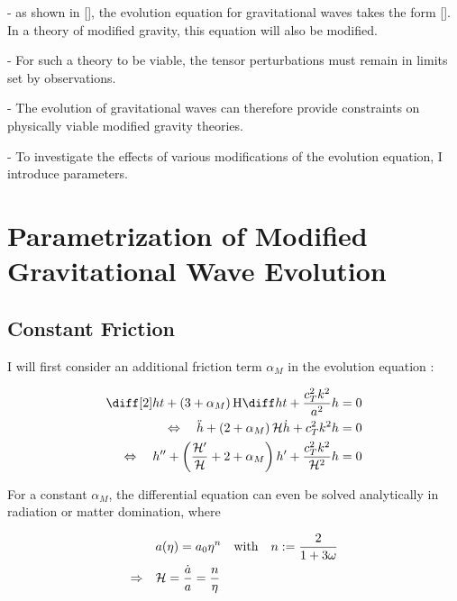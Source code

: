 \documentclass[parskip=half]{scrreprt}
\begin{document}
- as shown in [], the evolution equation for gravitational waves takes the form []. In a theory of modified gravity, this equation will also be modified.

- For such a theory to be viable, the tensor perturbations must remain in limits set by observations.

- The evolution of gravitational waves can therefore provide constraints on physically viable modified gravity theories.

- To investigate the effects of various modifications of the evolution equation, I introduce parameters.



\chapter{Parametrization of Modified Gravitational Wave Evolution}


\section{Constant Friction}

I will first consider an additional friction term $\alpha_M$ in the evolution equation \citep{Pettorino2014}:

\begin{align}\label{eq:evolution_friction}
	\ddt{h} + \left( 3 + \alpha_M \right) \Hcosm \dt{h} + \frac{c_T^2 k^2}{a^2} h &= 0 \\
	\Leftrightarrow \quad \ddconf{h} + \left( 2 + \alpha_M \right) \Hconf \dconf{h} + c_T^2 k^2 h &= 0 \\
    \Leftrightarrow \quad \ddefold{h} + \left( \frac{\defold{\Hconf}}{\Hconf} + 2 + \alpha_M \right) \defold{h} + \frac{c_T^2 k^2}{\Hconf^2} h &= 0
\end{align}


For a constant $\alpha_M$, the differential equation can even be solved analytically in radiation or matter domination, where

\begin{align}
	&a(\eta) = a_0 \eta^n \quad \textrm{with} \quad n := \frac{2}{1+3\omega} \\
	\Rightarrow \quad &\mathcal{H} = \frac{\dot{a}}{a} = \frac{n}{\eta}
\end{align}
\end{document}

